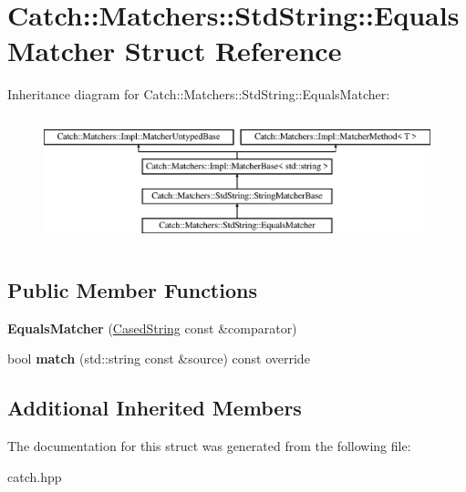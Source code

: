 \hypertarget{structCatch_1_1Matchers_1_1StdString_1_1EqualsMatcher}{}\section{Catch\+::Matchers\+::Std\+String\+::Equals\+Matcher Struct Reference}
\label{structCatch_1_1Matchers_1_1StdString_1_1EqualsMatcher}
Inheritance diagram for Catch\+::Matchers\+::Std\+String\+::Equals\+Matcher\+:\begin{figure}[H]
\begin{center}
\leavevmode
\includegraphics[height=3.758389cm]{structCatch_1_1Matchers_1_1StdString_1_1EqualsMatcher}
\end{center}
\end{figure}
\subsection*{Public Member Functions}
\begin{DoxyCompactItemize}
\item 
\mbox{\label{structCatch_1_1Matchers_1_1StdString_1_1EqualsMatcher_ab740f1fb2310e9fe3fed5134d4c7e4c8}} 
{\bfseries Equals\+Matcher} (\mbox{\hyperlink{structCatch_1_1Matchers_1_1StdString_1_1CasedString}{Cased\+String}} const \&comparator)
\item 
\mbox{\label{structCatch_1_1Matchers_1_1StdString_1_1EqualsMatcher_a0bb9d64693f7bb1ef7441062d219f21a}} 
bool {\bfseries match} (std\+::string const \&source) const override
\end{DoxyCompactItemize}
\subsection*{Additional Inherited Members}


The documentation for this struct was generated from the following file\+:\begin{DoxyCompactItemize}
\item 
catch.\+hpp\end{DoxyCompactItemize}
